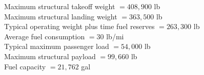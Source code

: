 \documentclass{KPS_assignment}
\begin{document}
\begin{table}[h!]
\vspace{0.5cm}

\begin{flushleft}
Maximum structural takeoff weight $= 408{,}900$ lb \\
Maximum structural landing weight $= 363{,}500$ lb \\
Typical operating weight plus time fuel reserves $= 263{,}300$ lb \\
Average fuel consumption $= 30$ lb/mi \\
Typical maximum passenger load $= 54{,}000$ lb \\
Maximum structural payload $= 99{,}660$ lb \\
Fuel capacity $= 21{,}762$ gal
\end{flushleft}

\end{table}

\newpage
\end{document}
